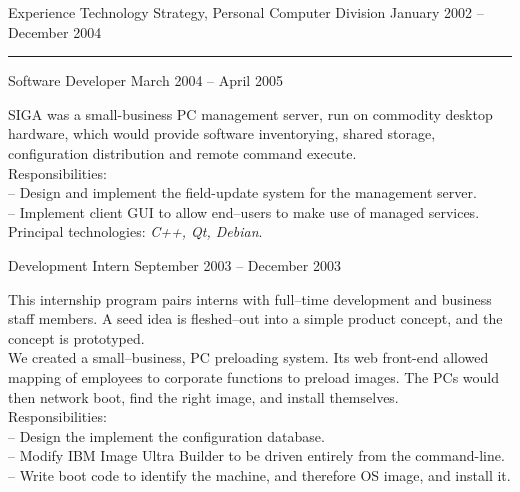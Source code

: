 \documentclass[letterpaper, 11pt]{article}
\begin{document}
\begin{resume}
\begin{category}{Experience}
                     {Technology Strategy, Personal Computer Division} {January 2002 -- December 2004}
            \rule[1ex]{\textwidth}{1pt}
            \begin{block}
                 {Software Developer}
                         { }                                 {March 2004 -- April 2005}
                \par
                SIGA was a small-business PC management server, run on commodity desktop
                hardware, which would provide software inventorying, shared storage,
                configuration distribution and remote command execute.
                \\[1ex]
                Responsibilities: \\
                -- Design and implement the field-update system for the management server. \\
                -- Implement client GUI to allow end--users to make use of managed services.
                \\[1ex]
                Principal technologies: \emph{C++, Qt, Debian}.
                \smallskip
            \end{block}
            \begin{block}
                 {Development Intern}
                         { }                           {September 2003 -- December 2003}
                \par
                This internship program pairs interns with full--time development and
                business staff members.  A seed idea is fleshed--out into a simple
                product concept, and the concept is prototyped.
                \\[1ex]
                We created a small--business, PC preloading system.  Its web front-end allowed
                mapping of employees to corporate functions to preload images.  The PCs would
                then network boot, find the right image, and install themselves.
                \\[1ex]
                Responsibilities: \\
                -- Design the implement the configuration database. \\
                -- Modify IBM Image Ultra Builder to be driven entirely from the command-line. \\
                -- Write boot code to identify the machine, and therefore OS image, and install it.

\end{block}
\end{category}
\end{resume}
\end{document}
